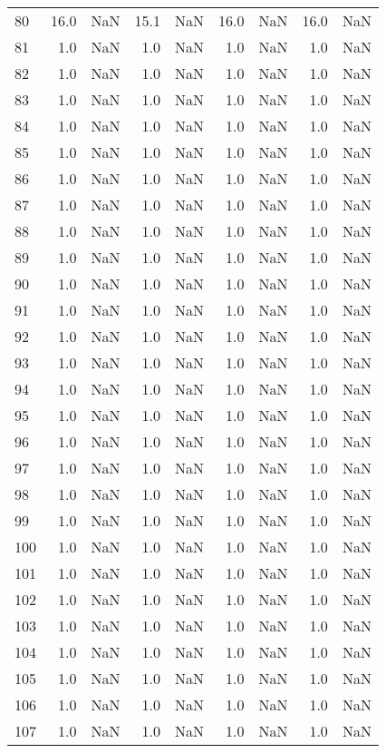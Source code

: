\begin{tabular}{lrrrrrrrr}
80 & 16.0 & NaN & 15.1 & NaN & 16.0 & NaN & 16.0 & NaN \\
81 & 1.0 & NaN & 1.0 & NaN & 1.0 & NaN & 1.0 & NaN \\
82 & 1.0 & NaN & 1.0 & NaN & 1.0 & NaN & 1.0 & NaN \\
83 & 1.0 & NaN & 1.0 & NaN & 1.0 & NaN & 1.0 & NaN \\
84 & 1.0 & NaN & 1.0 & NaN & 1.0 & NaN & 1.0 & NaN \\
85 & 1.0 & NaN & 1.0 & NaN & 1.0 & NaN & 1.0 & NaN \\
86 & 1.0 & NaN & 1.0 & NaN & 1.0 & NaN & 1.0 & NaN \\
87 & 1.0 & NaN & 1.0 & NaN & 1.0 & NaN & 1.0 & NaN \\
88 & 1.0 & NaN & 1.0 & NaN & 1.0 & NaN & 1.0 & NaN \\
89 & 1.0 & NaN & 1.0 & NaN & 1.0 & NaN & 1.0 & NaN \\
90 & 1.0 & NaN & 1.0 & NaN & 1.0 & NaN & 1.0 & NaN \\
91 & 1.0 & NaN & 1.0 & NaN & 1.0 & NaN & 1.0 & NaN \\
92 & 1.0 & NaN & 1.0 & NaN & 1.0 & NaN & 1.0 & NaN \\
93 & 1.0 & NaN & 1.0 & NaN & 1.0 & NaN & 1.0 & NaN \\
94 & 1.0 & NaN & 1.0 & NaN & 1.0 & NaN & 1.0 & NaN \\
95 & 1.0 & NaN & 1.0 & NaN & 1.0 & NaN & 1.0 & NaN \\
96 & 1.0 & NaN & 1.0 & NaN & 1.0 & NaN & 1.0 & NaN \\
97 & 1.0 & NaN & 1.0 & NaN & 1.0 & NaN & 1.0 & NaN \\
98 & 1.0 & NaN & 1.0 & NaN & 1.0 & NaN & 1.0 & NaN \\
99 & 1.0 & NaN & 1.0 & NaN & 1.0 & NaN & 1.0 & NaN \\
100 & 1.0 & NaN & 1.0 & NaN & 1.0 & NaN & 1.0 & NaN \\
101 & 1.0 & NaN & 1.0 & NaN & 1.0 & NaN & 1.0 & NaN \\
102 & 1.0 & NaN & 1.0 & NaN & 1.0 & NaN & 1.0 & NaN \\
103 & 1.0 & NaN & 1.0 & NaN & 1.0 & NaN & 1.0 & NaN \\
104 & 1.0 & NaN & 1.0 & NaN & 1.0 & NaN & 1.0 & NaN \\
105 & 1.0 & NaN & 1.0 & NaN & 1.0 & NaN & 1.0 & NaN \\
106 & 1.0 & NaN & 1.0 & NaN & 1.0 & NaN & 1.0 & NaN \\
107 & 1.0 & NaN & 1.0 & NaN & 1.0 & NaN & 1.0 & NaN \\

\end{tabular}
